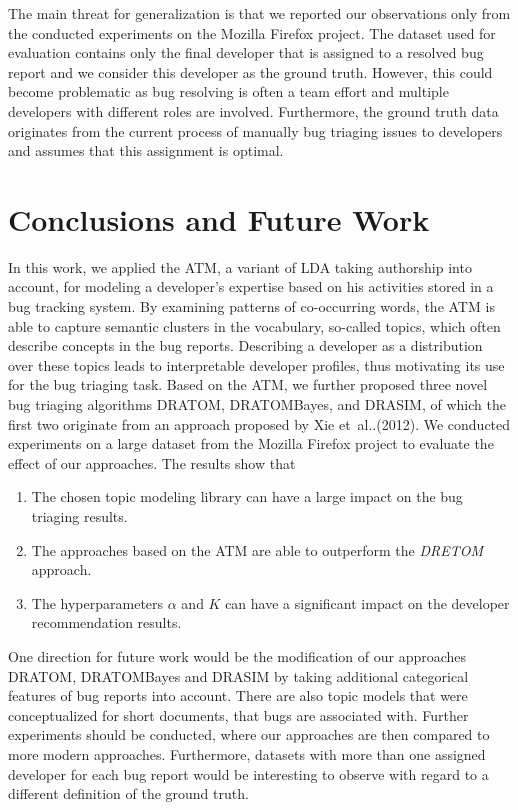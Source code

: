 \documentclass[a4paper,twoside]{article}
\makeatletter
\DeclareRobustCommand\onedot{\futurelet\@let@token\@onedot}
\def\@onedot{\ifx\@let@token.\else.\null\fi\xspace}
\def\etal{et~al\onedot}
\makeatother
\begin{document}
The main threat for generalization is that we reported our observations only from the conducted experiments on the Mozilla Firefox project.
The dataset used for evaluation contains only the final developer that is assigned to a resolved bug report and we consider this developer as the ground truth.
However, this could become problematic as bug resolving is often a team effort and multiple developers with different roles are involved.
Furthermore, the ground truth data originates from the current process of manually bug triaging issues to developers and assumes that this assignment is optimal.

\section{Conclusions and Future Work }
\label{section: conclusion}

In this work, we applied the \ac{ATM}, a variant of \ac{LDA} taking authorship into account, for modeling a developer's expertise based on his activities stored in a bug tracking system.
By examining patterns of co-occurring words, the \ac{ATM} is able to capture semantic clusters in the vocabulary, so-called topics, which often describe concepts in the bug reports.
Describing a developer as a distribution over these topics leads to interpretable developer profiles, thus motivating its use for the bug triaging task.
Based on the \ac{ATM}, we further proposed three novel bug triaging algorithms \ac{DRATOM}, \ac{DRATOMBayes}, and \ac{DRASIM}, of which the first two originate from an approach proposed by Xie \etal (2012).
We conducted experiments on a large dataset from the Mozilla Firefox project to evaluate the effect of our approaches.
The results show that
\begin{enumerate}
    \item The chosen topic modeling library can have a large impact on the bug triaging results.
    \item The approaches based on the \ac{ATM} are able to outperform the \textit{DRETOM} approach.
    \item The hyperparameters $\alpha$ and $K$ can have a significant impact on the developer recommendation results.
\end{enumerate}

One direction for future work would be the modification of our approaches \ac{DRATOM}, \ac{DRATOMBayes} and \ac{DRASIM} by taking additional categorical features of bug reports into account.
There are also topic models that were conceptualized for short documents, that bugs are associated with.
Further experiments should be conducted, where our approaches are then compared to more modern approaches.
Furthermore, datasets with more than one assigned developer for each bug report would be interesting to observe with regard to a different definition of the ground truth.
\end{document}
